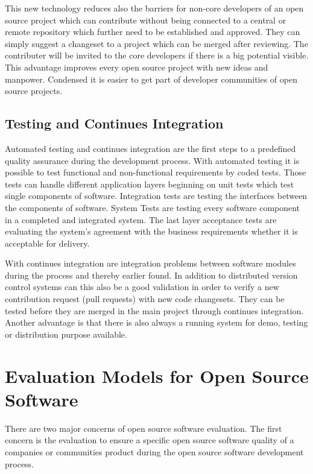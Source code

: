 \documentclass[DIV=calc,paper=a4,fontsize=9pt,twocolumn]{scrartcl}
\begin{document}
This new technology reduces also the barriers for non-core developers of an open source project which can contribute without being connected to a central or remote repository which further need to be established and approved. They can simply suggest a changeset to a project which can be merged after reviewing. The contributer will be invited to the core developers if there is a big potential visible. This advantage improves every open source project with new ideas and manpower. Condensed it is easier to get part of developer communities of open source projects. \citep{rodriguez2012distributed}

\subsection{Testing and Continues Integration}

Automated testing and continues integration are the first steps to a predefined quality assurance during the development process. With automated testing it is possible to test functional and non-functional requirements by coded tests. Those tests can handle different application layers beginning on unit tests which test single components of software. Integration tests are testing the interfaces between the components of software. System Tests are testing every software component in a completed and integrated system. The last layer acceptance tests are evaluating the system's agreement with the business requirements whether it is acceptable for delivery. \citep{abran2001guide}

With continues integration are integration problems between software modules during the process and thereby earlier found. In addition to distributed version control systems can this also be a good validation in order to verify a new contribution request (pull requests) with new code changesets. They can be tested before they are merged in the main project through continues integration. Another advantage is that there is also always a running system for demo, testing or distribution purpose available.

\section{Evaluation Models for Open Source Software}

There are two major concerns of open source software evaluation. The first concern is the evaluation to ensure a specific open source software quality of a companies or communities product during the open source software development process. 
\end{document}
